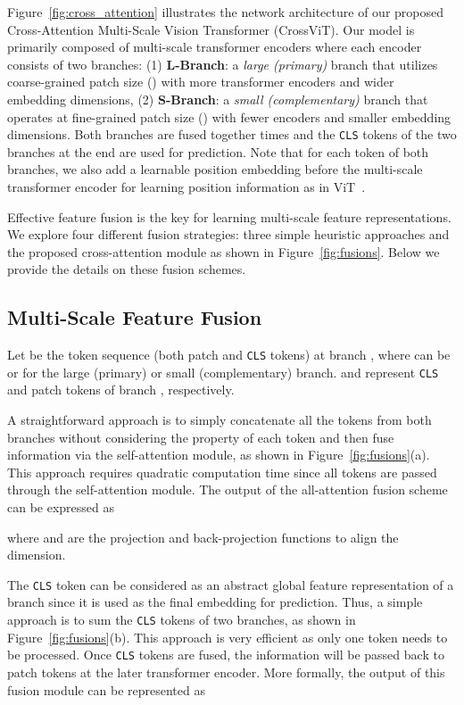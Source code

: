 \documentclass[10pt,twocolumn,letterpaper]{article}
\def\clstoken{\texttt{CLS}\xspace}
\def\ours{CrossViT\xspace}
\newcommand{\myparagraph}[1]{\vspace{1mm} \noindent {\textbf{#1}}}
\begin{document}
Figure~\ref{fig:cross_attention} illustrates the network architecture of our proposed Cross-Attention Multi-Scale Vision Transformer (\ours). Our model is primarily composed of  multi-scale transformer encoders where each encoder consists of two branches: (1) \textbf{L-Branch}: a \textit{large (primary)} branch that utilizes coarse-grained patch size () with more transformer encoders and wider embedding dimensions, (2) \textbf{S-Branch}: a \textit{small (complementary)} branch that operates at fine-grained patch size () with fewer encoders and smaller embedding dimensions. Both branches are fused together  times and the \clstoken tokens of the two branches at the end are used for prediction. 
Note that for each token of both branches, we also add a learnable position embedding before the multi-scale transformer encoder for learning position information as in ViT~\cite{ViT_dosovitskiy2021an}.

Effective feature fusion is the key for learning multi-scale feature representations. We explore four different fusion strategies: three simple heuristic approaches and the proposed cross-attention module as shown in Figure~\ref{fig:fusions}. Below we provide the details on these fusion schemes. 


\subsection{Multi-Scale Feature Fusion}
\label{subsec:ms_fusion}

Let  be the token sequence (both patch and \clstoken tokens) at branch , where  can be  or  for the large (primary) or small (complementary) branch. 
 and  represent \clstoken and patch tokens of branch , respectively. 

\vspace{1mm}
\myparagraph{All-Attention Fusion.}
A straightforward approach is to simply concatenate all the tokens from both branches without considering the property of each token and then fuse information via the self-attention module, as shown in Figure~\ref{fig:fusions}(a). 
This approach requires quadratic computation time since all tokens are passed through the self-attention module. 
The output  of the all-attention fusion scheme can be expressed as 
 
where  and  are the projection and back-projection functions to align the dimension.

\vspace{1mm}
\myparagraph{Class Token Fusion.} 
The \clstoken token can be considered as an abstract global feature representation of a branch since it is used as the final embedding for prediction. Thus, a simple approach is to sum the \clstoken tokens of two branches, as shown in Figure~\ref{fig:fusions}(b). This approach is very efficient as only one token needs to be processed. Once \clstoken tokens are fused, the information will be passed back to patch tokens at the later transformer encoder. More formally, the output  of this fusion module can be represented as 
 
\end{document}
